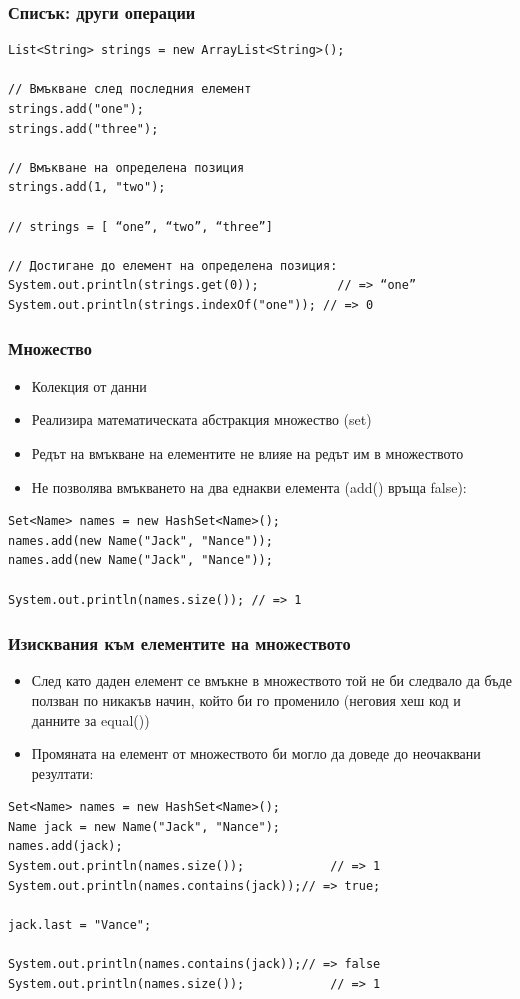 \documentclass[ignorenonframetext, hyperref=unicode,compress]{beamer}
\begin{document}
\begin{frame}[containsverbatim]\frametitle{Списък: други операции}
\begin{lstlisting}
List<String> strings = new ArrayList<String>();

// Вмъкване след последния елемент
strings.add("one");
strings.add("three");

// Вмъкване на определена позиция
strings.add(1, "two");

// strings = [ “one”, “two”, “three”]

// Достигане до елемент на определена позиция:
System.out.println(strings.get(0)); 		  // => “one”
System.out.println(strings.indexOf("one")); // => 0
\end{lstlisting}
\end{frame}

\begin{frame}[containsverbatim]\frametitle{Множество}
\begin{itemize}
\item Колекция от данни
\item Реализира математическата абстракция множество (set)
\item Редът на вмъкване на елементите не влияе на редът им в множеството
\item Не позволява вмъкването на два еднакви елемента (add() връща false):
\end{itemize}
\begin{lstlisting}
Set<Name> names = new HashSet<Name>();
names.add(new Name("Jack", "Nance"));
names.add(new Name("Jack", "Nance")); 

System.out.println(names.size()); // => 1\end{lstlisting}
\end{frame}

\begin{frame}[containsverbatim]\frametitle{Изисквания към елементите на множеството}
\begin{itemize}
\item След като даден елемент се вмъкне в множеството той не би следвало да бъде ползван по никакъв начин, който би го променило (неговия хеш код и данните за equal())
\item Промяната на елемент от множеството би могло да доведе до неочаквани резултати:
\end{itemize}
\begin{lstlisting}
Set<Name> names = new HashSet<Name>();
Name jack = new Name("Jack", "Nance");
names.add(jack);
System.out.println(names.size()); 			 // => 1
System.out.println(names.contains(jack));// => true;

jack.last = "Vance";

System.out.println(names.contains(jack));// => false
System.out.println(names.size()); 			 // => 1
\end{lstlisting}
\end{frame}
\end{document}
